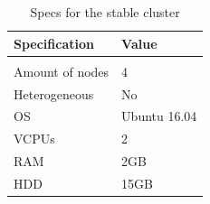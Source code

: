 \documentclass[a4paper,english]{report}
\begin{document}
\begin{table}[H]
	\centering
	\caption{Specs for the stable cluster}
	\label{table:cluster_stable}
	\begin{tabular}{ll}
		\\
		\multicolumn{1}{l}{\bfseries Specification} & \multicolumn{1}{l}{\bfseries Value} \\ \hline \\
		Amount of nodes & 4  \\
		Heterogeneous & No  \\
		OS & Ubuntu 16.04  \\
		VCPUs & 2  \\
		RAM & 2GB  \\ 
		HDD & 15GB  \\
	\end{tabular}
\end{table}
\end{document}
